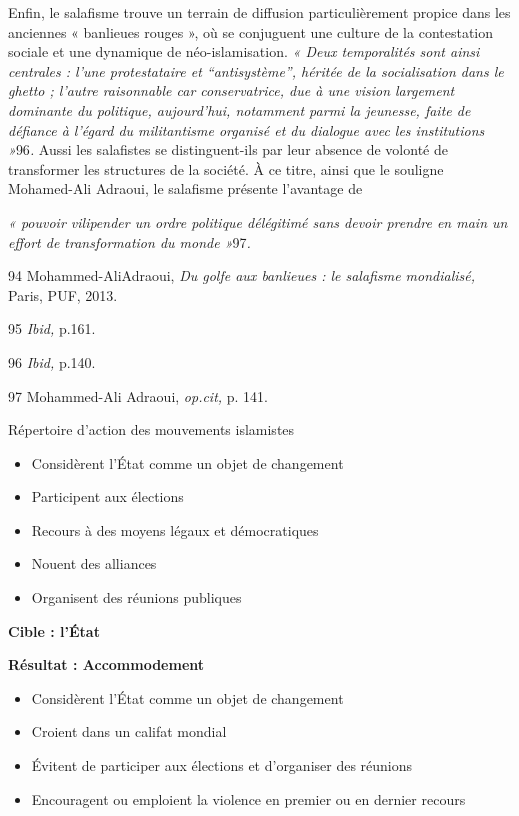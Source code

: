 Enfin, le salafisme trouve un terrain de diffusion particulièrement
propice dans les anciennes « banlieues rouges », où se conjuguent une
culture de la contestation sociale et une dynamique de néo-islamisation.
\emph{« Deux temporalités sont ainsi centrales : l'une protestataire et
``antisystème'', héritée de la socialisation dans le ghetto ; l'autre
raisonnable car conservatrice, due à une vision largement dominante du
politique, aujourd'hui, notamment parmi la jeunesse, faite de défiance à
l'égard du militantisme organisé et du dialogue avec les institutions
»}96\emph{.} Aussi les salafistes se distinguent-ils par leur absence de
volonté de transformer les structures de la société. À ce titre, ainsi
que le souligne Mohamed-Ali Adraoui, le salafisme présente l'avantage de

\emph{« pouvoir vilipender un ordre politique délégitimé sans devoir
prendre en main un effort de transformation du monde »}97\emph{.}

94 Mohammed-AliAdraoui, \emph{Du golfe aux banlieues : le salafisme
mondialisé,} Paris, PUF, 2013.

95 \emph{Ibid,} p.161.

96 \emph{Ibid,} p.140.

97 Mohammed-Ali Adraoui, \emph{op.cit,} p. 141.




Répertoire d'action des mouvements islamistes

\begin{itemize}
\item
  Considèrent l'État comme un objet de changement
\item
  Participent aux élections
\item
  Recours à des moyens légaux et démocratiques
\item
  Nouent des alliances
\item
  Organisent des réunions publiques
\end{itemize}


\textbf{Cible : l'État}

\textbf{Résultat : Accommodement}


\begin{itemize}
\item
  Considèrent l'État comme un objet de changement
\item
  Croient dans un califat mondial
\item
  Évitent de participer aux élections et d'organiser des réunions
\item
  Encouragent ou emploient la violence en premier ou en dernier recours
\end{itemize}


